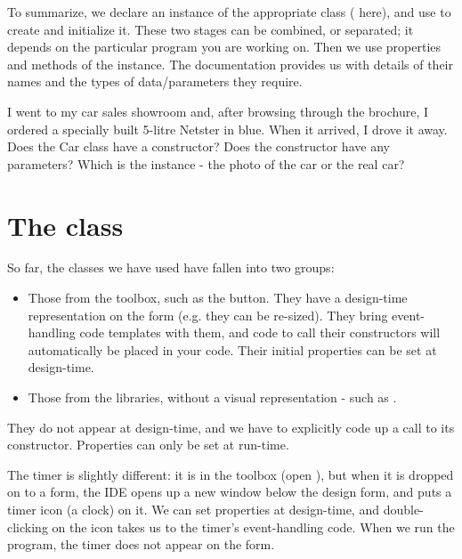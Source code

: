 		To summarize, we declare an instance of the appropriate class ( here), and use  to create and initialize it. These two stages can be combined, or separated; it depends on the particular program you are working on. Then we use properties and methods of the instance. The documentation provides us with details of their names and the types of data/parameters they require.

		\begin{stqb}
			\begin{STQ}
				\item	I went to my car sales showroom and, after browsing through the brochure, I ordered a specially built 5-litre Netster in blue. When it arrived, I drove it away. Does the Car class have a constructor? Does the constructor have any parameters? Which is the instance - the photo of the car or the real car?
			\end{STQ}
		\end{stqb}


	\section{The  class}
		So far, the classes we have used have fallen into two groups:
		\begin{itemize}
			\item Those from the toolbox, such as the button. They have a design-time representation on the form (e.g. they can be re-sized). They bring event-handling code templates with them, and code to call their constructors will automatically 
be placed in your code. Their initial properties can be set at design-time.
			\item Those from the libraries, without a visual representation - such as . 
		\end{itemize}
		They do not appear at design-time, and we have to explicitly code up a call to its constructor. Properties can only be set at run-time.
		
		The timer is slightly different: it is in the toolbox (open ), but when it is dropped on to a form, the IDE opens up a new  window below the design form, and puts a timer icon (a clock) on it. We can set properties at design-time, and double-clicking on the icon takes us to the timer's event-handling code. When we run the program, the timer does not appear on the form.
		
